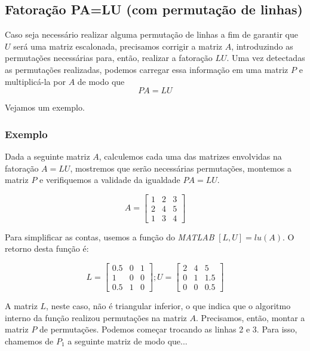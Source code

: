 \documentclass[12pt]{article}
\begin{document}
\subsection{Fatoração PA=LU (com permutação de linhas)}

Caso seja necessário realizar alguma permutação de linhas a fim de garantir que $U$ será uma matriz escalonada, precisamos corrigir a matriz $A$, introduzindo as permutações necessárias para, então, realizar a fatoração $LU$. Uma vez detectadas as permutações realizadas, podemos carregar essa informação em uma matriz $P$ e multiplicá-la por $A$ de modo que
\begin{equation*}
	PA=LU
\end{equation*}

Vejamos um exemplo.

\subsubsection{Exemplo}
Dada a seguinte matriz $A$, calculemos cada uma das matrizes envolvidas na fatoração $A=LU$, mostremos que serão necessárias permutações, montemos a matriz $P$ e verifiquemos a validade da igualdade $PA=LU$.

\begin{equation*}
	A=\begin{bmatrix}
		1 & 2 & 3\\
		2 & 4 & 5\\
		1 & 3 & 4
	\end{bmatrix}
\end{equation*}

Para simplificar as contas, usemos a função do \textit{MATLAB} $[L,U]=lu(A)$. O retorno desta função é:

\begin{equation*}
	L=\begin{bmatrix}
		0.5 & 0 & 1\\
		1 & 0 & 0\\
		0.5 & 1 & 0
	\end{bmatrix}; U=
	\begin{bmatrix}
		2 & 4 & 5\\
		0 & 1 & 1.5\\
		0 & 0 & 0.5
	\end{bmatrix}
\end{equation*}	

A matriz $L$, neste caso, não é triangular inferior, o que indica que o algoritmo interno da função realizou permutações na matriz $A$. Precisamos, então, montar a matriz $P$ de permutações. Podemos começar trocando as linhas 2 e 3. Para isso, chamemos de $P_1$ a seguinte matriz de modo que...
\end{document}
